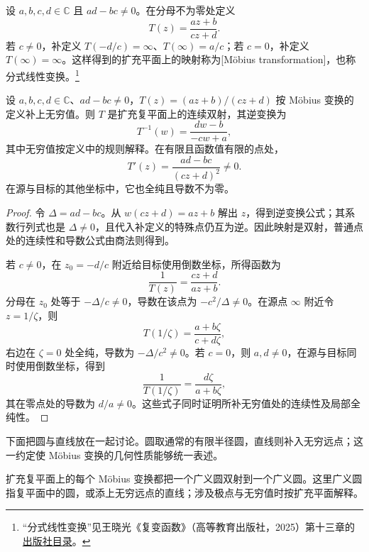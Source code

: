 \begin{definition}
\label{b3:def:01-elementary-mobius}
设 \(a,b,c,d\in\mathbb C\) 且 \(ad-bc\neq0\)。在分母不为零处定义
\[
T(z)=\frac{az+b}{cz+d}.
\]
若 \(c\neq0\)，补定义 \(T(-d/c)=\infty\)、\(T(\infty)=a/c\)；若 \(c=0\)，补定义 \(T(\infty)=\infty\)。这样得到的扩充平面上的映射称为[Möbius transformation]，也称分式线性变换。\footnote{“分式线性变换”见王晓光《复变函数》（高等教育出版社，2025）第十三章的\href{https://xuanshu.hep.com.cn/front/h5Mobile/bookDetails?bookId=68598849e119ac9729fe438b}{出版社目录}。}
\end{definition}

\begin{proposition}
\label{b3:prop:01-elementary-mobius-inverse}
设 \(a,b,c,d\in\mathbb C\)、\(ad-bc\ne0\)，\(T(z)=(az+b)/(cz+d)\) 按 Möbius 变换的定义补上无穷值。则 \(T\) 是扩充复平面上的连续双射，其逆变换为
\[
T^{-1}(w)=\frac{dw-b}{-cw+a},
\]
其中无穷值按定义中的规则解释。在有限且函数值有限的点处，
\[
T'(z)=\frac{ad-bc}{(cz+d)^2}\neq0.
\]
在源与目标的其他坐标中，它也全纯且导数不为零。
\end{proposition}

\begin{proof}
令 \(\Delta=ad-bc\)。从 \(w(cz+d)=az+b\) 解出 \(z\)，得到逆变换公式；其系数行列式也是 \(\Delta\neq0\)，且代入补定义的特殊点仍互为逆。因此映射是双射，普通点处的连续性和导数公式由商法则得到。

若 \(c\neq0\)，在 \(z_0=-d/c\) 附近给目标使用倒数坐标，所得函数为
\[
\frac1{T(z)}=\frac{cz+d}{az+b}.
\]
分母在 \(z_0\) 处等于 \(-\Delta/c\neq0\)，导数在该点为 \(-c^2/\Delta\neq0\)。在源点 \(\infty\) 附近令 \(z=1/\zeta\)，则
\[
T(1/\zeta)=\frac{a+b\zeta}{c+d\zeta},
\]
右边在 \(\zeta=0\) 处全纯，导数为 \(-\Delta/c^2\neq0\)。若 \(c=0\)，则 \(a,d\neq0\)，在源与目标同时使用倒数坐标，得到
\[
\frac1{T(1/\zeta)}=\frac{d\zeta}{a+b\zeta},
\]
其在零点处的导数为 \(d/a\neq0\)。这些式子同时证明所补无穷值处的连续性及局部全纯性。
\end{proof}

下面把圆与直线放在一起讨论。圆取通常的有限半径圆，直线则补入无穷远点；这一约定使 Möbius 变换的几何性质能够统一表述。

\begin{proposition}
\label{b3:prop:01-elementary-mobius-circles}
扩充复平面上的每个 Möbius 变换都把一个广义圆双射到一个广义圆。这里广义圆指复平面中的圆，或添上无穷远点的直线；涉及极点与无穷值时按扩充平面解释。
\end{proposition}

